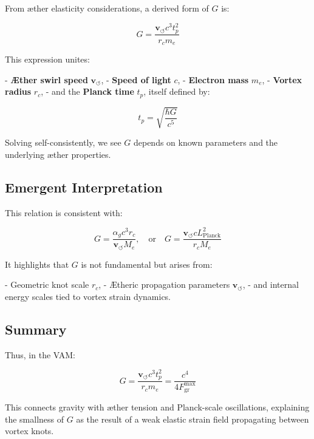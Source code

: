From æther elasticity considerations, a derived form of \( G \) is:

\begin{equation}
    G = \frac{\mathbf{v}_{\scriptscriptstyle\boldsymbol{\circlearrowleft}} c^3 t_p^2}{r_c m_e}
\end{equation}

This expression unites:

- \textbf{Æther swirl speed} \( \mathbf{v}_{\scriptscriptstyle\boldsymbol{\circlearrowleft}} \),
- \textbf{Speed of light} \( c \),
- \textbf{Electron mass} \( m_e \),
- \textbf{Vortex radius} \( r_c \),
- and the \textbf{Planck time} \( t_p \), itself defined by:

\[
    t_p = \sqrt{\frac{\hbar G}{c^5}}
\]

Solving self-consistently, we see \( G \) depends on known parameters and the underlying æther properties.

\subsection*{Emergent Interpretation}

This relation is consistent with:

\[
    G = \frac{\alpha_g c^3 r_c}{\mathbf{v}_{\scriptscriptstyle\boldsymbol{\circlearrowleft}} M_e}, \quad \text{or} \quad G = \frac{\mathbf{v}_{\scriptscriptstyle\boldsymbol{\circlearrowleft}} c L_{\text{Planck}}^2}{r_c M_e}
\]

It highlights that \( G \) is not fundamental but arises from:

- Geometric knot scale \( r_c \),
- Ætheric propagation parameters \( \mathbf{v}_{\scriptscriptstyle\boldsymbol{\circlearrowleft}} \),
- and internal energy scales tied to vortex strain dynamics.

\subsection*{Summary}

Thus, in the VAM:

\begin{equation}
    \boxed{G = \frac{\mathbf{v}_{\scriptscriptstyle\boldsymbol{\circlearrowleft}} c^3 t_p^2}{r_c m_e} = \frac{c^4}{4 F^{\text{max}}_{\text{gr}}}}
\end{equation}

This connects gravity with æther tension and Planck-scale oscillations, explaining the smallness of \( G \) as the result of a weak elastic strain field propagating between vortex knots.
